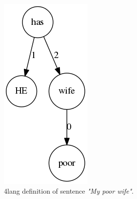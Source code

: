 \begin{figure}
	\centering
	\includegraphics[scale=0.5]{figures/mypoor}
	\caption{4lang definition of sentence \textit{"My poor wife"}.}
	\label{fig:mypoor}
\end{figure}

